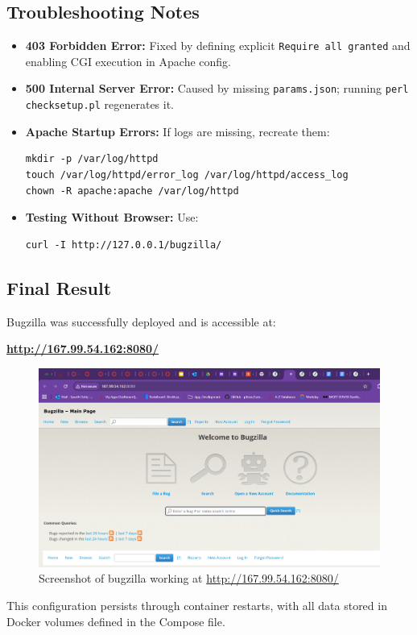 \subsection{Troubleshooting Notes}

\begin{itemize}
    \item \textbf{403 Forbidden Error:}  
    Fixed by defining explicit \texttt{Require all granted} and enabling CGI execution in Apache config.

    \item \textbf{500 Internal Server Error:}  
    Caused by missing \texttt{params.json}; running \texttt{perl checksetup.pl} regenerates it.

    \item \textbf{Apache Startup Errors:}  
    If logs are missing, recreate them:
    \begin{verbatim}
mkdir -p /var/log/httpd
touch /var/log/httpd/error_log /var/log/httpd/access_log
chown -R apache:apache /var/log/httpd
    \end{verbatim}

    \item \textbf{Testing Without Browser:}  
    Use:
    \begin{verbatim}
curl -I http://127.0.0.1/bugzilla/
    \end{verbatim}
\end{itemize}

\subsection{Final Result}

Bugzilla was successfully deployed and is accessible at:

\begin{center}
\textbf{\url{http://167.99.54.162:8080/}}
\end{center}
\begin{figure}
    \centering
    \includegraphics[width=0.7\linewidth]{png/bugzilla.png}
    \caption{Screenshot of bugzilla working at \url{http://167.99.54.162:8080/} }
    \label{fig:placeholder}
\end{figure}
This configuration persists through container restarts, with all data stored in Docker volumes defined in the Compose file.
